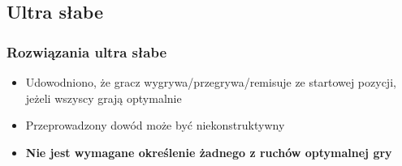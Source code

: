 \documentclass[polish,envcountsect,10pt]{beamer}
\begin{document}
        \subsection{Ultra słabe}
            \begin{frame}
                \frametitle{Rozwiązania ultra słabe}
                \begin{itemize}
                    \item<1-> Udowodniono, że gracz wygrywa/przegrywa/remisuje ze startowej pozycji, jeżeli wszyscy grają optymalnie
                    \item<2-> Przeprowadzony dowód może być niekonstruktywny
                    \item<3-> \textbf{Nie jest wymagane określenie żadnego z ruchów optymalnej gry}
                \end{itemize}
            \end{frame}
\end{document}

